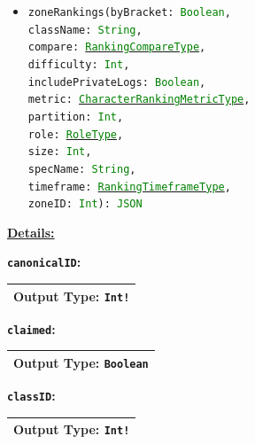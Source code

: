 \documentclass[10pt, a4paper]{memoir}
\numberwithin{equation}{section}
\theoremstyle{plain}
\theoremstyle{defp}
\theoremstyle{dotless}
\theoremstyle{definition}
\theoremstyle{dotless}
\theoremstyle{dotless}
\theoremstyle{defp}
\theoremstyle{defp}
\theoremstyle{be}          %
\theoremstyle{defp}
\newcommand\ttt[1]{\texttt{#1}}
\newcommand\type[1]{\ttt{\textcolor{green}{#1}}}
\begin{document}
\begin{itemize}[noitemsep,topsep=1pt]
\begin{itemize}[itemsep=1pt,topsep=1pt]
		\item \ttt{zoneRankings(byBracket: \type{Boolean}, \\className: \type{String}, \\compare: \hyperref[sec:RankingCompareType]{\type{RankingCompareType}}, \\difficulty: \type{Int}, \\includePrivateLogs: \type{Boolean}, \\metric: \hyperref[sec:CharacterRankingMetricType]{\type{CharacterRankingMetricType}}, \\partition: \type{Int}, \\role: \hyperref[sec:RoleType]{\type{RoleType}}, \\size: \type{Int}, \\specName: \type{String}, \\timeframe: \hyperref[sec:RankingTimeframeType]{\type{RankingTimeframeType}}, \\zoneID: \type{Int}): \type{JSON}}
	\end{itemize}
\end{itemize}

\underline{\textbf{Details:}}

\textbf{\ttt{canonicalID}:}

\begin{table}[h]
	\centering
	\begin{tabular}{ |p{3cm}|p{3cm}|p{3cm}|  }
		\hline
		\multicolumn{3}{|c|}{Output Type: \ttt{Int!}} \\
		\hline
	\end{tabular}
\end{table}


\medskip

\textbf{\ttt{claimed}:}

\begin{table}[h]
	\centering
	\begin{tabular}{ |p{3cm}|p{3cm}|p{3cm}|  }
		\hline
		\multicolumn{3}{|c|}{Output Type: \ttt{Boolean}} \\
		\hline
	\end{tabular}
\end{table}

\medskip

\textbf{\ttt{classID}:}

\begin{table}[h]
	\centering
	\begin{tabular}{ |p{3cm}|p{3cm}|p{3cm}|  }
		\hline
		\multicolumn{3}{|c|}{Output Type: \ttt{Int!}} \\
		\hline
	\end{tabular}
\end{table}
\end{document}
